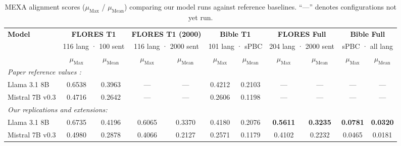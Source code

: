 \documentclass{article}
\begin{document}
\begin{table}[t]
\centering
\footnotesize

\caption{
MEXA alignment scores
($\mu_{\text{Max}}$ / $\mu_{\text{Mean}}$)
comparing our model runs against reference baselines.
``---'' denotes configurations not yet run.
}

\label{tab:mexa_results}

\begin{adjustbox}{width=\textwidth}

\begin{tabular}{l|cc|cc|cc|cc|cc}

\toprule

\textbf{Model}
& \multicolumn{2}{c|}{\textbf{FLORES T1}}
& \multicolumn{2}{c|}{\textbf{FLORES T1 (2000)}}
& \multicolumn{2}{c|}{\textbf{Bible T1}}
& \multicolumn{2}{c|}{\textbf{FLORES Full}}
& \multicolumn{2}{c}{\textbf{Bible Full}} \\

& \multicolumn{2}{c|}{116 lang · 100 sent}
& \multicolumn{2}{c|}{116 lang · 2000 sent}
& \multicolumn{2}{c|}{101 lang · sPBC}
& \multicolumn{2}{c|}{204 lang · 2000 sent}
& \multicolumn{2}{c}{sPBC · all lang} \\

& $\mu_{\text{Max}}$
& $\mu_{\text{Mean}}$
& $\mu_{\text{Max}}$
& $\mu_{\text{Mean}}$
& $\mu_{\text{Max}}$
& $\mu_{\text{Mean}}$
& $\mu_{\text{Max}}$
& $\mu_{\text{Mean}}$
& $\mu_{\text{Max}}$
& $\mu_{\text{Mean}}$ \\

\midrule

\multicolumn{11}{l}{
\textit{Paper reference values \citep{kargaran2025mexa}:}
} \\

Llama 3.1 8B
& 0.6538 & 0.3963
& --- & ---
& 0.4212 & 0.2103
& --- & ---
& --- & --- \\

Mistral 7B v0.3
& 0.4716 & 0.2642
& --- & ---
& 0.2606 & 0.1198
& --- & ---
& --- & --- \\

\midrule

\multicolumn{11}{l}{
\textit{Our replications and extensions:}
} \\

Llama 3.1 8B
& 0.6735 & 0.4196
& 0.6065 & 0.3370
& 0.4180 & 0.2076
& \textbf{0.5611} & \textbf{0.3235}
& \textbf{0.0781} & \textbf{0.0320} \\

Mistral 7B v0.3
& 0.4980 & 0.2878
& 0.4066 & 0.2127
& 0.2571 & 0.1179
& 0.4102 & 0.2232
& 0.0465 & 0.0181 \\


\end{tabular}
\end{adjustbox}
\end{table}
\end{document}
